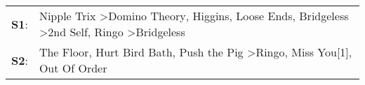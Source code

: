 \begin{supertabular}{p{0.03\textwidth}p{0.92\textwidth}}
 \textbf{S1}:  &  Nipple Trix\textsuperscript{} \textgreater \enspace Domino Theory\textsuperscript{}, \enspace Higgins\textsuperscript{}, \enspace Loose Ends\textsuperscript{}, \enspace Bridgeless\textsuperscript{} \textgreater \enspace 2nd Self\textsuperscript{}, \enspace Ringo\textsuperscript{} \textgreater \enspace Bridgeless\textsuperscript{}  \enspace  \\
 \textbf{S2}:  &                                                                                               The Floor\textsuperscript{}, \enspace Hurt Bird Bath\textsuperscript{}, \enspace Push the Pig\textsuperscript{} \textgreater \enspace Ringo\textsuperscript{}, \enspace Miss You[1]\textsuperscript{}, \enspace Out Of Order\textsuperscript{}  \enspace  \\
\end{supertabular}
